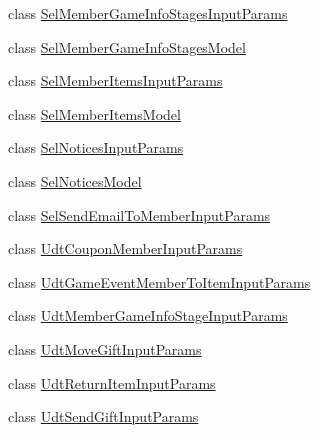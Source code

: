 \begin{DoxyCompactItemize}
\item 
class \hyperlink{a00098}{Sel\+Member\+Game\+Info\+Stages\+Input\+Params}
\item 
class \hyperlink{a00099}{Sel\+Member\+Game\+Info\+Stages\+Model}
\item 
class \hyperlink{a00100}{Sel\+Member\+Items\+Input\+Params}
\item 
class \hyperlink{a00101}{Sel\+Member\+Items\+Model}
\item 
class \hyperlink{a00102}{Sel\+Notices\+Input\+Params}
\item 
class \hyperlink{a00103}{Sel\+Notices\+Model}
\item 
class \hyperlink{a00104}{Sel\+Send\+Email\+To\+Member\+Input\+Params}
\item 
class \hyperlink{a00109}{Udt\+Coupon\+Member\+Input\+Params}
\item 
class \hyperlink{a00110}{Udt\+Game\+Event\+Member\+To\+Item\+Input\+Params}
\item 
class \hyperlink{a00111}{Udt\+Member\+Game\+Info\+Stage\+Input\+Params}
\item 
class \hyperlink{a00112}{Udt\+Move\+Gift\+Input\+Params}
\item 
class \hyperlink{a00113}{Udt\+Return\+Item\+Input\+Params}
\item 
class \hyperlink{a00114}{Udt\+Send\+Gift\+Input\+Params}
\end{DoxyCompactItemize}
